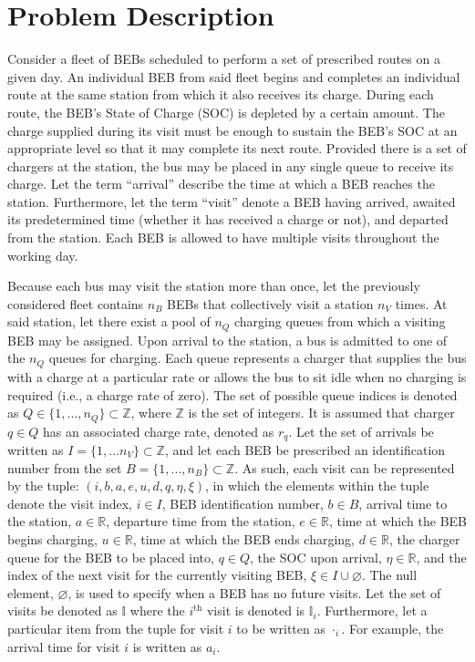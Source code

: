 \documentclass[energies,article,submit,moreauthors]{Definitions/mdpi}
\newcommand{\visit}{(i, b, a, e, u, d, q, \eta, \xi)}
\newcommand{\I}{\mathbb{I}}                 %
\newcommand{\Iset}{I}                       %
\begin{document}
\section{Problem Description}
\label{sec:sa-problem-description}
Consider a fleet of BEBs scheduled to perform a set of prescribed routes on a given day. An individual BEB from said
fleet begins and completes an individual route at the same station from which it also receives its charge. During each
route, the BEB's State of Charge (SOC) is depleted by a certain amount. The charge supplied during its visit must be
enough to sustain the BEB's SOC at an appropriate level so that it may complete its next route. Provided there is a set
of chargers at the station, the bus may be placed in any single queue to receive its charge. Let the term ``arrival''
describe the time at which a BEB reaches the station. Furthermore, let the term ``visit'' denote a BEB having arrived,
awaited its predetermined time (whether it has received a charge or not), and departed from the station. Each BEB is
allowed to have multiple visits throughout the working day.

Because each bus may visit the station more than once, let the previously considered fleet contains \(n_B\) BEBs that
collectively visit a station \(n_V\) times. At said station, let there exist a pool of \(n_Q\) charging queues from which a
visiting BEB may be assigned. Upon arrival to the station, a bus is admitted to one of the \(n_Q\) queues for charging.
Each queue represents a charger that supplies the bus with a charge at a particular rate or allows the bus to sit idle
when no charging is required (i.e., a charge rate of zero). The set of possible queue indices is denoted as \(Q \in
\{1,...,n_Q\} \subset \mathbb{Z}\), where \(\mathbb{Z}\) is the set of integers. It is assumed that charger \(q \in Q\) has an associated charge rate,
denoted as \(r_q\). Let the set of arrivals be written as \(\Iset = \{ 1, ... n_V \} \subset \mathbb{Z}\), and let each BEB be prescribed
an identification number from the set \(B = \{ 1, ..., n_B \} \subset \mathbb{Z}\). As such, each visit can be represented by the tuple:
\(\visit\), in which the elements within the tuple denote the visit index, \(i \in I\), BEB identification number, \(b \in B\),
arrival time to the station, \(a \in \mathbb{R}\), departure time from the station, \(e \in \mathbb{R}\), time at which the BEB begins charging,
\(u \in \mathbb{R}\), time at which the BEB ends charging, \(d \in \mathbb{R}\), the charger queue for the BEB to be placed into, \(q \in Q\), the SOC
upon arrival, \(\eta \in \mathbb{R}\), and the index of the next visit for the currently visiting BEB, \(\xi \in I \cup \varnothing\). The null
element, \(\varnothing\), is used to specify when a BEB has no future visits. Let the set of visits be denoted as \(\I\)
where the \(i^{\text{th}}\) visit is denoted is \(\I_i\). Furthermore, let a particular item from the tuple for visit \(i\) to
be written as \(\cdot_i\). For example, the arrival time for visit \(i\) is written as \(a_i\).
\end{document}
